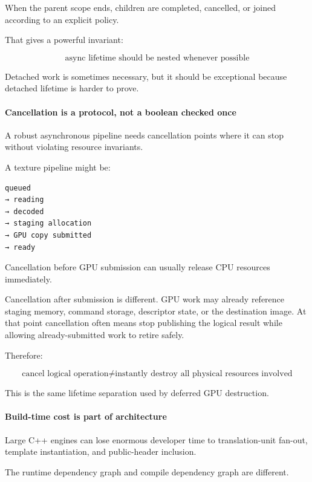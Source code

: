 When the parent scope ends, children are completed, cancelled, or joined according to an explicit policy.

That gives a powerful invariant:

\[
\boxed{
\text{async lifetime should be nested whenever possible}
}
\]

Detached work is sometimes necessary, but it should be exceptional because detached lifetime is harder to prove.

\paragraph{Cancellation is a protocol, not a boolean checked once}\label{cancellation-is-a-protocol-not-a-boolean-checked-once}

A robust asynchronous pipeline needs cancellation points where it can stop without violating resource invariants.

A texture pipeline might be:

\begin{verbatim}
queued
→ reading
→ decoded
→ staging allocation
→ GPU copy submitted
→ ready
\end{verbatim}

Cancellation before GPU submission can usually release CPU resources immediately.

Cancellation after submission is different. GPU work may already reference staging memory, command storage, descriptor state, or the destination image. At that point cancellation often means stop publishing the logical result while allowing already-submitted work to retire safely.

Therefore:

\[
\boxed{
\text{cancel logical operation}
\neq
\text{instantly destroy all physical resources involved}
}
\]

This is the same lifetime separation used by deferred GPU destruction.

\paragraph{Build-time cost is part of architecture}\label{build-time-cost-is-part-of-architecture}

Large C++ engines can lose enormous developer time to translation-unit fan-out, template instantiation, and public-header inclusion.

The runtime dependency graph and compile dependency graph are different.

